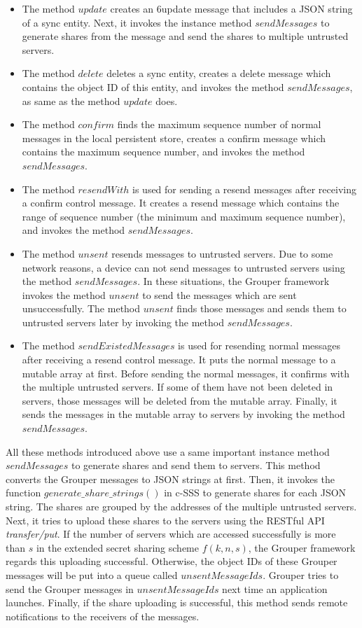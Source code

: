 \documentclass[a4paper,11pt]{report}
\begin{document}
\begin{itemize}[leftmargin=7mm]
	\setlength{\itemsep}{1pt}
	\setlength{\parskip}{0pt}
	\setlength{\parsep}{0pt}
	\item 
	The method $update$ creates an 6update message that includes a JSON string of a sync entity. Next, it invokes the instance method $sendMessages$ to generate shares from the message and send the shares to multiple untrusted servers.
	\item 
	The method $delete$ deletes a sync entity, creates a delete message which contains the object ID of this entity, and invokes the method $sendMessages$, as same as the method $update$ does.
	\item 
	The method $confirm$ finds the maximum sequence number of normal messages in the local persistent store, creates a confirm message which contains the maximum sequence number, and invokes the method $sendMessages$.
	\item 
	The method $resendWith$ is used for sending a resend messages after receiving a confirm control message.
	It creates a resend message which contains the range of sequence number (the minimum and maximum sequence number), and invokes the method $sendMessages$.
	\item 
	The method $unsent$ resends messages to untrusted servers. 
	Due to some network reasons, a device can not send messages to untrusted servers using the method $sendMessages$.
	In these situations, the Grouper framework invokes the method $unsent$ to send the messages which are sent unsuccessfully.
	The method $unsent$ finds those messages and sends them to untrusted servers later by invoking the method $sendMessages$.
	\item 
	The method $sendExistedMessages$ is used for resending normal messages after receiving a resend control message.
	It puts the normal message to a mutable array at first.
	Before sending the normal messages, it confirms with the multiple untrusted servers.
	If some of them have not been deleted in servers, those messages will be deleted from the mutable array.
	Finally, it sends the messages in the mutable array to servers by invoking the method $sendMessages$.
\end{itemize}

All these methods introduced above use a same important instance method $sendMessages$ to generate shares and send them to servers.
This method converts the Grouper messages to JSON strings at first.
Then, it invokes the function $generate\_share\_strings()$ in c-SSS\cite{c-sss} to generate shares for each JSON string.
The shares are grouped by the addresses of the multiple untrusted servers.
Next, it tries to upload these shares to the servers using the RESTful API \emph{transfer/put}.
If the number of servers which are accessed successfully is more than $s$ in the extended secret sharing scheme $f(k, n, s)$, the Grouper framework regards this uploading successful.
Otherwise, the object IDs of these Grouper messages will be put into a queue called $unsentMessageIds$.
Grouper tries to send the Grouper messages in $unsentMessageIds$ next time an application launches.
Finally, if the share uploading is successful, this method sends remote notifications to the receivers of the messages.
\end{document}
